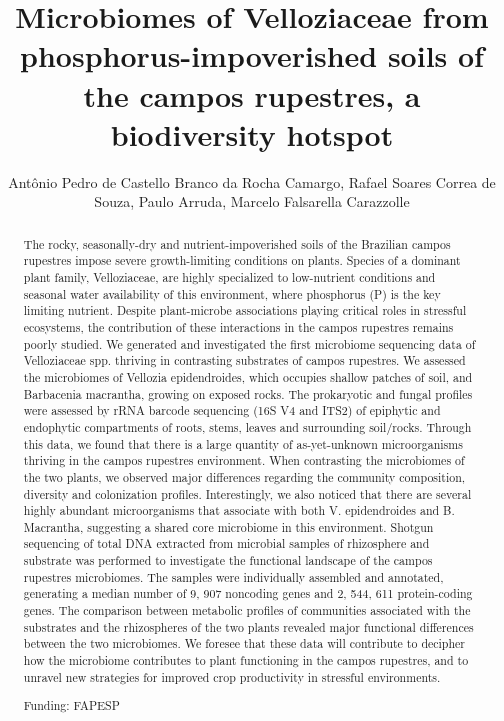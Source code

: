 \documentclass[twoside]{article}
\title{\vspace{-15mm}\fontsize{24pt}{10pt}\selectfont\textbf{ Microbiomes of Velloziaceae from phosphorus-impoverished soils of the campos rupestres,  a biodiversity hotspot }} %
\author{ Ant\^onio Pedro de Castello Branco da Rocha Camargo, Rafael Soares Correa de Souza, Paulo Arruda, Marcelo Falsarella Carazzolle }
\affil{ Universidade Estadual de Campinas }
\date{}
\begin{document}
  
  
  \maketitle %
  
  
  \thispagestyle{fancy} %
  
  
  \begin{abstract}
  The rocky,  seasonally-dry and nutrient-impoverished soils of the Brazilian campos rupestres impose severe growth-limiting conditions on plants. Species of a dominant plant family,  Velloziaceae,  are highly specialized to low-nutrient conditions and seasonal water availability of this environment,  where phosphorus (P) is the key limiting nutrient. Despite plant-microbe associations playing critical roles in stressful ecosystems,  the contribution of these interactions in the campos rupestres remains poorly studied. We generated and investigated the first microbiome sequencing data of Velloziaceae spp. thriving in contrasting substrates of campos rupestres.
We assessed the microbiomes of Vellozia epidendroides,  which occupies shallow patches of soil,  and Barbacenia macrantha,  growing on exposed rocks. The prokaryotic and fungal profiles were assessed by rRNA barcode sequencing (16S V4 and ITS2) of epiphytic and endophytic compartments of roots,  stems,  leaves and surrounding soil/rocks. Through this data,  we found that there is a large quantity of as-yet-unknown microorganisms thriving in the campos rupestres environment. When contrasting the microbiomes of the two plants,  we observed major differences regarding the community composition,  diversity and colonization profiles. Interestingly,  we also noticed that there are several highly abundant microorganisms that associate with both V. epidendroides and B. Macrantha,  suggesting a shared core microbiome in this environment.
Shotgun sequencing of total DNA extracted from microbial samples of rhizosphere and substrate was performed to investigate the functional landscape of the campos rupestres microbiomes. The samples were individually assembled and annotated,  generating a median number of 9, 907 noncoding genes and 2, 544, 611 protein-coding genes. The comparison between metabolic profiles of communities associated with the substrates and the rhizospheres of the two plants revealed major functional differences between the two microbiomes.
We foresee that these data will contribute to decipher how the microbiome contributes to plant functioning in the campos rupestres,  and to unravel new strategies for improved crop productivity in stressful environments.
  
  Funding: FAPESP \\ 
  \end{abstract}
  
\end{document}
